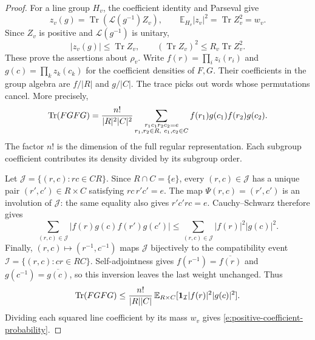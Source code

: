 \begin{proof}
For a line group $H_v$, the coefficient identity and Parseval give
\[
 z_v(g)=\operatorname{Tr}(\mathcal L(g^{-1})Z_v),\qquad
 \mathbb E_{H_v}|z_v|^2=\operatorname{Tr}Z_v^2=w_v.
\]
Since $Z_v$ is positive and $\mathcal L(g^{-1})$ is unitary,
\[
 |z_v(g)|\le\operatorname{Tr}Z_v,
 \qquad(\operatorname{Tr}Z_v)^2\le R_v\operatorname{Tr}Z_v^2.
\]
These prove the assertions about $\rho_v$.
Write $f(r)=\prod_i z_i(r_i)$ and $g(c)=\prod_k z_k(c_k)$ for
the coefficient densities of $F,G$. Their coefficients in the group
algebra are $f/|R|$ and $g/|C|$.
The trace picks out words whose permutations cancel. More precisely,
\begin{equation}\label{e:four-factor-identity}
 \operatorname{Tr}(FGFG)=\frac{n!}{|R|^2|C|^2}
 \sum_{\substack{r_1c_1r_2c_2=e\\r_1,r_2\in R,\ c_1,c_2\in C}}
       f(r_1)g(c_1)f(r_2)g(c_2).
\end{equation}
The factor $n!$ is the dimension of the full regular representation. Each subgroup coefficient contributes its density divided by its subgroup order.

Let $\mathcal J=\{(r,c):rc\in CR\}$. Since $R\cap C=\{e\}$, every $(r,c)\in\mathcal J$ has a unique pair $(r',c')\in R\times C$ satisfying $rc\,r'c'=e$. The map $\Psi(r,c)=(r',c')$ is an involution of $\mathcal J$: the same equality also gives $r'c'rc=e$. Cauchy--Schwarz therefore gives
\[
 \sum_{(r,c)\in\mathcal J}
   |f(r)g(c)f(r')g(c')|
 \le \sum_{(r,c)\in\mathcal J}|f(r)|^2|g(c)|^2.
\]
Finally, $(r,c)\mapsto(r^{-1},c^{-1})$ maps $\mathcal J$ bijectively to the compatibility event $\mathcal I=\{(r,c):cr\in RC\}$. Self-adjointness gives $f(r^{-1})=\overline{f(r)}$ and $g(c^{-1})=\overline{g(c)}$, so this inversion leaves the last weight unchanged. Thus
\begin{equation}\label{e:four-factor}
 \operatorname{Tr}(FGFG)\le\frac{n!}{|R||C|}\,
       \mathbb E_{R\times C}
          [\mathbf1_{\mathcal I}|f(r)|^2|g(c)|^2].
\end{equation}
Dividing each squared line coefficient by its mass $w_v$ gives
\eqref{e:positive-coefficient-probability}.
\end{proof}

